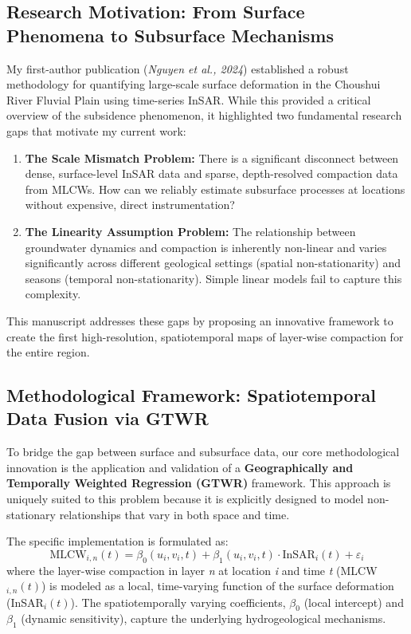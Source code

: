 \documentclass[12pt, a4paper]{article}
\begin{document}
\subsection{Research Motivation: From Surface Phenomena to Subsurface Mechanisms}
%
%
My first-author publication (\textit{Nguyen et al., 2024}) established a robust methodology for quantifying large-scale surface deformation in the Choushui River Fluvial Plain using time-series InSAR. While this provided a critical overview of the subsidence phenomenon, it highlighted two fundamental research gaps that motivate my current work: 
%
\begin{enumerate}
	\item \textbf{The Scale Mismatch Problem:} There is a significant disconnect between dense, surface-level InSAR data and sparse, depth-resolved compaction data from MLCWs. How can we reliably estimate subsurface processes at locations without expensive, direct instrumentation?
	\item \textbf{The Linearity Assumption Problem:} The relationship between groundwater dynamics and compaction is inherently non-linear and varies significantly across different geological settings (spatial non-stationarity) and seasons (temporal non-stationarity). Simple linear models fail to capture this complexity.
\end{enumerate}
%
This manuscript addresses these gaps by proposing an innovative framework to create the first high-resolution, spatiotemporal maps of layer-wise compaction for the entire region.

\subsection{Methodological Framework: Spatiotemporal Data Fusion via GTWR}
%
%
To bridge the gap between surface and subsurface data, our core methodological innovation is the application and validation of a \textbf{Geographically and Temporally Weighted Regression (GTWR)} framework. This approach is uniquely suited to this problem because it is explicitly designed to model non-stationary relationships that vary in both space and time.

The specific implementation is formulated as:
%
\begin{equation}
	\text{MLCW}_{i,n}(t) = \beta_{0}(u_i, v_i, t) + \beta_{1}(u_i, v_i, t) \cdot \text{InSAR}_{i}(t) + \varepsilon_i
\end{equation}
%
where the layer-wise compaction in layer \textit{n} at location \textit{i} and time \textit{t} (MLCW$_{i,n}(t)$) is modeled as a local, time-varying function of the surface deformation (InSAR$_{i}(t)$). The spatiotemporally varying coefficients, $\beta_{0}$ (local intercept) and $\beta_{1}$ (dynamic sensitivity), capture the underlying hydrogeological mechanisms. 
\end{document}
